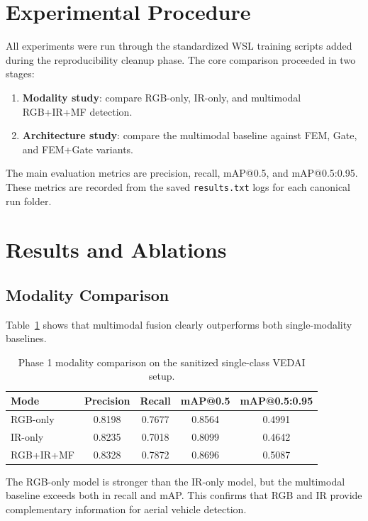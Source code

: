 \documentclass[sigconf,nonacm]{acmart}
\begin{document}
\section{Experimental Procedure}
All experiments were run through the standardized WSL training scripts added during the reproducibility cleanup phase. The core comparison proceeded in two stages:
\begin{enumerate}[leftmargin=*]
    \item \textbf{Modality study}: compare RGB-only, IR-only, and multimodal RGB+IR+MF detection.
    \item \textbf{Architecture study}: compare the multimodal baseline against FEM, Gate, and FEM+Gate variants.
\end{enumerate}

The main evaluation metrics are precision, recall, mAP@0.5, and mAP@0.5:0.95. These metrics are recorded from the saved \texttt{results.txt} logs for each canonical run folder.

\section{Results and Ablations}
\subsection{Modality Comparison}
Table~\ref{tab:modality} shows that multimodal fusion clearly outperforms both single-modality baselines.

\begin{table}[h]
    \centering
    \caption{Phase 1 modality comparison on the sanitized single-class VEDAI setup.}
    \label{tab:modality}
    \begin{tabular}{lcccc}
        \toprule
        Mode & Precision & Recall & mAP@0.5 & mAP@0.5:0.95 \\
        \midrule
        RGB-only & 0.8198 & 0.7677 & 0.8564 & 0.4991 \\
        IR-only & 0.8235 & 0.7018 & 0.8099 & 0.4642 \\
        RGB+IR+MF & 0.8328 & 0.7872 & 0.8696 & 0.5087 \\
        \bottomrule
    \end{tabular}
\end{table}

The RGB-only model is stronger than the IR-only model, but the multimodal baseline exceeds both in recall and mAP. This confirms that RGB and IR provide complementary information for aerial vehicle detection.
\end{document}
